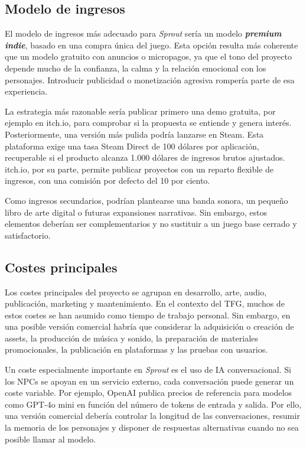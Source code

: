 \documentclass[12pt,twoside,titlepage]{report}
\begin{document}
\subsection{Modelo de ingresos}

El modelo de ingresos más adecuado para \textit{Sprout} sería un modelo \textbf{\textit{premium indie}}, basado en una compra única del juego. Esta opción resulta más coherente que un modelo gratuito con anuncios o micropagos, ya que el tono del proyecto depende mucho de la confianza, la calma y la relación emocional con los personajes. Introducir publicidad o monetización agresiva rompería parte de esa experiencia.

La estrategia más razonable sería publicar primero una demo gratuita, por ejemplo en itch.io, para comprobar si la propuesta se entiende y genera interés. Posteriormente, una versión más pulida podría lanzarse en Steam. Esta plataforma exige una tasa Steam Direct de 100 dólares por aplicación, recuperable si el producto alcanza 1.000 dólares de ingresos brutos ajustados. itch.io, por su parte, permite publicar proyectos con un reparto flexible de ingresos, con una comisión por defecto del 10 por ciento.

Como ingresos secundarios, podrían plantearse una banda sonora, un pequeño libro de arte digital o futuras expansiones narrativas. Sin embargo, estos elementos deberían ser complementarios y no sustituir a un juego base cerrado y satisfactorio.

\subsection{Costes principales}

Los costes principales del proyecto se agrupan en desarrollo, arte, audio, publicación, marketing y mantenimiento. En el contexto del TFG, muchos de estos costes se han asumido como tiempo de trabajo personal. Sin embargo, en una posible versión comercial habría que considerar la adquisición o creación de assets, la producción de música y sonido, la preparación de materiales promocionales, la publicación en plataformas y las pruebas con usuarios.

Un coste especialmente importante en \textit{Sprout} es el uso de IA conversacional. Si los NPCs se apoyan en un servicio externo, cada conversación puede generar un coste variable. Por ejemplo, OpenAI publica precios de referencia para modelos como GPT-4o mini en función del número de tokens de entrada y salida. Por ello, una versión comercial debería controlar la longitud de las conversaciones, resumir la memoria de los personajes y disponer de respuestas alternativas cuando no sea posible llamar al modelo.
\end{document}

